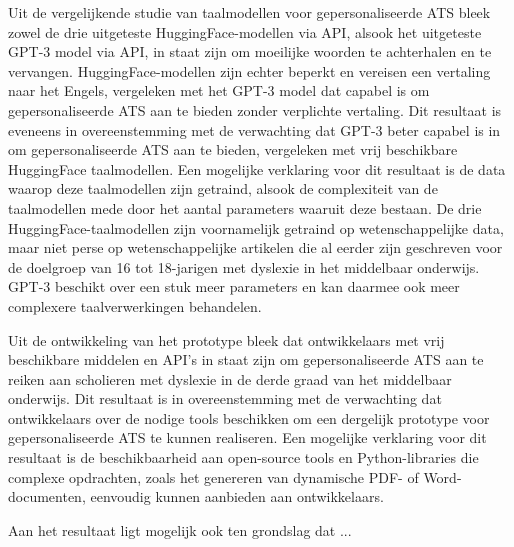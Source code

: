 Uit de vergelijkende studie van taalmodellen voor gepersonaliseerde ATS bleek zowel de drie uitgeteste HuggingFace-modellen via API, alsook het uitgeteste GPT-3 model via API, in staat zijn om moeilijke woorden te achterhalen en te vervangen. HuggingFace-modellen zijn echter beperkt en vereisen een vertaling naar het Engels, vergeleken met het GPT-3 model dat capabel is om gepersonaliseerde ATS aan te bieden zonder verplichte vertaling. Dit resultaat is eveneens in overeenstemming met de verwachting dat GPT-3 beter capabel is in om gepersonaliseerde ATS aan te bieden, vergeleken met vrij beschikbare HuggingFace taalmodellen. Een mogelijke verklaring voor dit resultaat is de data waarop deze taalmodellen zijn getraind, alsook de complexiteit van de taalmodellen mede door het aantal parameters waaruit deze bestaan. De drie HuggingFace-taalmodellen zijn voornamelijk getraind op wetenschappelijke data, maar niet perse op wetenschappelijke artikelen die al eerder zijn geschreven voor de doelgroep van 16 tot 18-jarigen met dyslexie in het middelbaar onderwijs. GPT-3 beschikt over een stuk meer parameters en kan daarmee ook meer complexere taalverwerkingen behandelen.


Uit de ontwikkeling van het prototype bleek dat ontwikkelaars met vrij beschikbare middelen en API's in staat zijn om gepersonaliseerde ATS aan te reiken aan scholieren met dyslexie in de derde graad van het middelbaar onderwijs. Dit resultaat is in overeenstemming met de verwachting dat ontwikkelaars over de nodige tools beschikken om een dergelijk prototype voor gepersonaliseerde ATS te kunnen realiseren. Een mogelijke verklaring voor dit resultaat is de beschikbaarheid aan open-source tools en Python-libraries die complexe opdrachten, zoals het genereren van dynamische PDF- of Word-documenten, eenvoudig kunnen aanbieden aan ontwikkelaars.



Aan het resultaat ligt mogelijk ook ten grondslag dat ...






















